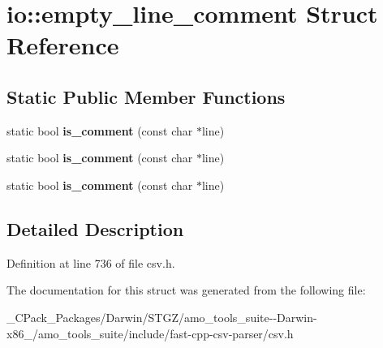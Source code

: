 \hypertarget{structio_1_1empty__line__comment}{}\section{io\+:\+:empty\+\_\+line\+\_\+comment Struct Reference}
\label{structio_1_1empty__line__comment}
\subsection*{Static Public Member Functions}
\begin{DoxyCompactItemize}
\item 
\mbox{\label{structio_1_1empty__line__comment_a88e2cee044a9aafabf3e2a0e64fa5289}} 
static bool {\bfseries is\+\_\+comment} (const char $\ast$line)
\item 
\mbox{\label{structio_1_1empty__line__comment_a88e2cee044a9aafabf3e2a0e64fa5289}} 
static bool {\bfseries is\+\_\+comment} (const char $\ast$line)
\item 
\mbox{\label{structio_1_1empty__line__comment_a88e2cee044a9aafabf3e2a0e64fa5289}} 
static bool {\bfseries is\+\_\+comment} (const char $\ast$line)
\end{DoxyCompactItemize}


\subsection{Detailed Description}


Definition at line 736 of file csv.\+h.



The documentation for this struct was generated from the following file\+:\begin{DoxyCompactItemize}
\item 
\+\_\+\+C\+Pack\+\_\+\+Packages/\+Darwin/\+S\+T\+G\+Z/amo\+\_\+tools\+\_\+suite-\/-\/\+Darwin-\/x86\+\_/amo\+\_\+tools\+\_\+suite/include/fast-\/cpp-\/csv-\/parser/csv.\+h\end{DoxyCompactItemize}
